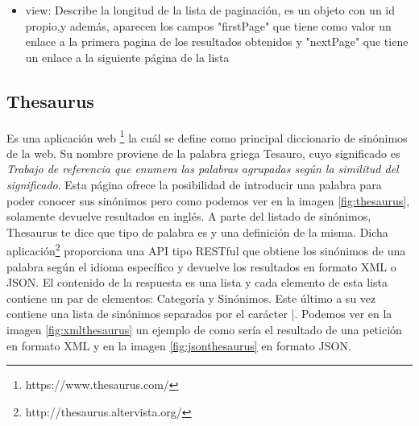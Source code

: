 \begin{itemize}
\begin{itemize}
		\item sources: Indica por qué ConceptNet guarda esa información, este campo como los anteriores, es un objeto que tiene su propio id y un campo @type, A parte, hay un campo \textit{contributor}, en el que aparece la fuente por la que se ha obtenido ese resultado y por último un campo \textit{process} indicando si la palabra se ha añadido mediante un proceso automático.
		\item start: Describe el nodo origen, es decir, la palabra que hemos introducido en ConceptNet para que haga la consulta, este campo esta compuesto por elementos ya descritos como son: @id, @type, label, language y term.
		\item surfaceText: Indica de que frase del lenguaje natural se han extraido los datos que estan guardados en conceptnet. En nuestro caso es nulo.
		\item weight: Indica la fiabilidad de la información guardada en conceptnet, siendo normal que su valor sea 1.0. Cuanto mayor sea este valor, más fiables serán.
	\end{itemize}
	\item view: Describe la longitud de la lista de paginación, es un objeto con un id propio,y además, aparecen los campos "firstPage" que tiene como valor un enlace a la primera pagina de los resultados obtenidos y "nextPage" que tiene un enlace a la siguiente página de la lista
\end{itemize}


\subsection{Thesaurus}
\label{cap:subsec:thesaurus}
Es una aplicación web \footnote{https://www.thesaurus.com/} la cuál se define como principal diccionario de sinónimos de la web. Su nombre proviene de la palabra griega Tesauro, cuyo significado es \textit{Trabajo de referencia que enumera las palabras agrupadas según la similitud del significado}. Esta página ofrece la posibilidad de introducir una palabra para poder conocer sus sinónimos pero como podemos ver en la imagen \ref{fig:thesaurus}, solamente devuelve resultados en inglés. A parte del listado de sinónimos,  Thesaurus te dice que tipo de palabra es y una definición de la misma.
Dicha aplicación\footnote{http://thesaurus.altervista.org/} proporciona una API tipo RESTful  que obtiene los sinónimos de una palabra según el idioma específico y devuelve los resultados en formato XML o JSON. El contenido de la respuesta es una lista y cada elemento de esta lista contiene un par de elementos: Categoría y Sinónimos. Este último a su vez contiene una lista de sinónimos separados por el carácter |. 
Podemos ver en la imagen \ref{fig:xmlthesaurus} un ejemplo de como sería el resultado de una petición en formato XML y en la imagen \ref{fig:jsonthesaurus} en formato JSON.

